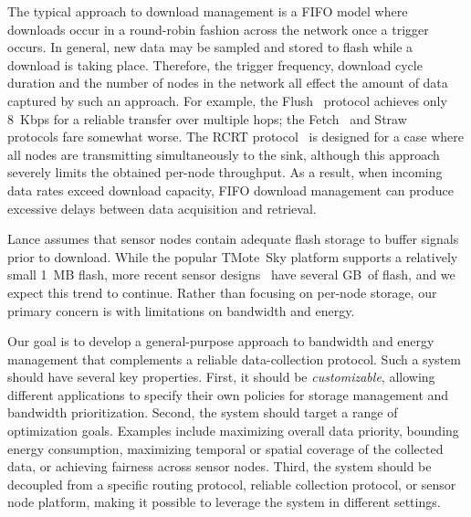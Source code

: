 The typical approach to download management is a FIFO model where downloads
occur in a round-robin fashion across the network once a trigger occurs. In
general, new data may be sampled and stored to flash while a download is
taking place.  Therefore, the trigger frequency, download cycle duration and
the number of nodes in the network all effect the amount of data captured by
such an approach.  For example, the Flush~\cite{flush-sensys07} protocol
achieves only 8~Kbps for a reliable transfer over multiple hops; the
Fetch~\cite{volcano-osdi06} and Straw~\cite{ggb-ipsn07} protocols fare
somewhat worse. The RCRT protocol~\cite{rcrt-sensys07} is designed for a case
where all nodes are transmitting simultaneously to the sink, although this
approach severely limits the obtained per-node throughput. As a result, when
incoming data rates exceed download capacity, FIFO download management can
produce excessive delays between data acquisition and retrieval.

Lance assumes that sensor nodes contain adequate flash storage to buffer
signals prior to download.  While the popular TMote~Sky platform supports a
relatively small 1~MB flash, more recent sensor designs~\cite{shimmer} have
several GB~of flash, and we expect this trend to continue. Rather than
focusing on per-node storage, our primary concern is with limitations on
bandwidth and energy.

Our goal is to develop a general-purpose approach to bandwidth and energy
management that complements a reliable data-collection protocol. Such a
system should have several key properties.  First, it should be {\em
customizable}, allowing different applications to specify their own policies
for storage management and bandwidth prioritization. Second, the system
should target a range of optimization goals. Examples include maximizing
overall data priority, bounding energy consumption, maximizing temporal or
spatial coverage of the collected data, or achieving fairness across sensor
nodes. Third, the system should be decoupled from a specific routing
protocol, reliable collection protocol, or sensor node platform, making it
possible to leverage the system in different settings. 


